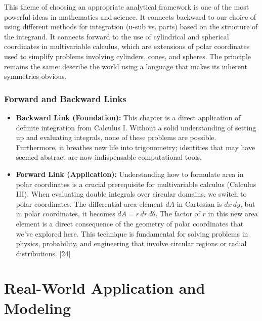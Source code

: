 \documentclass{article}
\begin{document}
This theme of choosing an appropriate analytical framework is one of the most powerful ideas in mathematics and science. It connects backward to our choice of using different methods for integration (u-sub vs. parts) based on the structure of the integrand. It connects forward to the use of cylindrical and spherical coordinates in multivariable calculus, which are extensions of polar coordinates used to simplify problems involving cylinders, cones, and spheres. The principle remains the same: describe the world using a language that makes its inherent symmetries obvious.

\section{Forward and Backward Links}
\begin{itemize}
    \item \textbf{Backward Link (Foundation):} This chapter is a direct application of definite integration from Calculus I. Without a solid understanding of setting up and evaluating integrals, none of these problems are possible. Furthermore, it breathes new life into trigonometry; identities that may have seemed abstract are now indispensable computational tools.
    \item \textbf{Forward Link (Application):} Understanding how to formulate area in polar coordinates is a crucial prerequisite for multivariable calculus (Calculus III). When evaluating double integrals over circular domains, we switch to polar coordinates. The differential area element $dA$ in Cartesian is $dx\,dy$, but in polar coordinates, it becomes $dA = r\,dr\,d\theta$. The factor of $r$ in this new area element is a direct consequence of the geometry of polar coordinates that we've explored here. This technique is fundamental for solving problems in physics, probability, and engineering that involve circular regions or radial distributions. [24]
\end{itemize}

\part{Real-World Application and Modeling}
\end{document}
